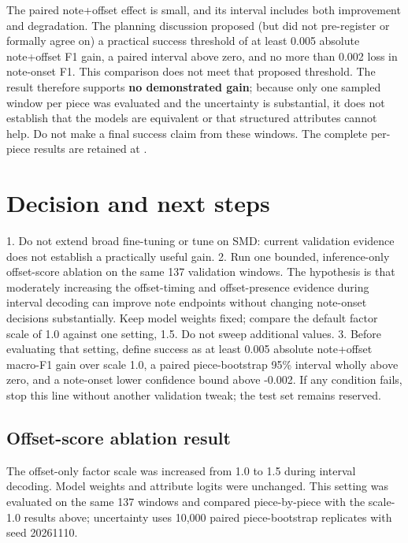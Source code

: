 \documentclass[11pt]{article}
\begin{document}
The paired note+offset effect is small, and its interval includes both
improvement and degradation. The planning discussion proposed (but did not
pre-register or formally agree on) a practical success threshold of at least
0.005 absolute note+offset F1 gain, a paired interval above zero, and no more
than 0.002 loss in note-onset F1. This comparison does not meet that proposed
threshold. The result therefore supports \textbf{no demonstrated gain};
because only one sampled window per piece was evaluated and the uncertainty
is substantial, it does not establish that the models are equivalent or
that structured attributes cannot help. Do not make a final success claim
from these windows. The complete per-piece results are retained at
.

\section{Decision and next steps}

1. Do not extend broad fine-tuning or tune on SMD: current validation evidence
   does not establish a practically useful gain.
2. Run one bounded, inference-only offset-score ablation on the same 137
   validation windows. The hypothesis is that moderately increasing the
   offset-timing and offset-presence evidence during interval decoding can
   improve note endpoints without changing note-onset decisions substantially.
   Keep model weights fixed; compare the default factor scale of 1.0 against
   one setting, 1.5. Do not sweep additional values.
3. Before evaluating that setting, define success as at least 0.005 absolute
   note+offset macro-F1 gain over scale 1.0, a paired piece-bootstrap 95\%
   interval wholly above zero, and a note-onset lower confidence bound above
   -0.002. If any condition fails, stop this line without another validation
   tweak; the test set remains reserved.

\subsection{Offset-score ablation result}

The offset-only factor scale was increased from 1.0 to 1.5 during interval
decoding. Model weights and attribute logits were unchanged. This setting
was evaluated on the same 137 windows and compared piece-by-piece with the
scale-1.0 results above; uncertainty uses 10,000 paired piece-bootstrap
replicates with seed 20261110.
\end{document}

